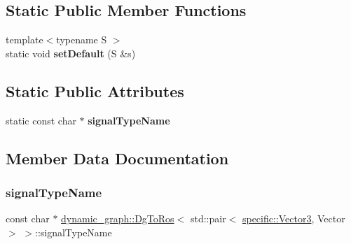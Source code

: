 \subsection*{Static Public Member Functions}
\begin{DoxyCompactItemize}
\item 
\mbox{\label{structdynamic__graph_1_1DgToRos_3_01std_1_1pair_3_01specific_1_1Vector3_00_01Vector_01_4_01_4_a85e4b5b1a35534adb8584c723bf93a7c}} 
{\footnotesize template$<$typename S $>$ }\\static void {\bfseries set\+Default} (S \&s)
\end{DoxyCompactItemize}
\subsection*{Static Public Attributes}
\begin{DoxyCompactItemize}
\item 
static const char $\ast$ {\bfseries signal\+Type\+Name}
\end{DoxyCompactItemize}


\subsection{Member Data Documentation}
\mbox{\label{structdynamic__graph_1_1DgToRos_3_01std_1_1pair_3_01specific_1_1Vector3_00_01Vector_01_4_01_4_a39142c1dac9d7e9aab9230dce9a6fd79}} 
\subsubsection{\texorpdfstring{signal\+Type\+Name}{signalTypeName}}
{\footnotesize\ttfamily const char $\ast$ \hyperlink{classdynamic__graph_1_1DgToRos}{dynamic\+\_\+graph\+::\+Dg\+To\+Ros}$<$ std\+::pair$<$ \hyperlink{classdynamic__graph_1_1specific_1_1Vector3}{specific\+::\+Vector3}, Vector $>$ $>$\+::signal\+Type\+Name\hspace{0.3cm}{\ttfamily [static]}}

